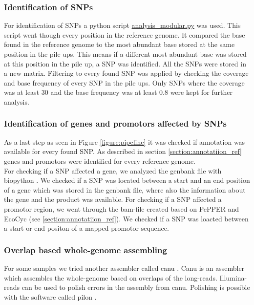 \subsubsection{Identification of SNPs} 
For identification of SNPs a python script \href{https://github.com/nahanoo/ESBL\_project/pileup.py}{analysis\_modular.py} was used. This script went though every position in the reference genome. It compared the base found in the reference genome to the most abundant base stored at the same position in the pile ups. This means if a different most abundant base was stored at this position in the pile up, a SNP was identified. All the SNPs were stored in a new matrix. Filtering to every found SNP was applied by checking the coverage and base frequency of every SNP in the pile ups. Only SNPs where the coverage was at least 30 and the base frequency was at least 0.8 were kept for further analysis. 

\subsubsection{Identification of genes and promotors affected by SNPs}
As a last step as seen in Figure \ref{figure:pipeline} it was checked if annotation was available for every found SNP. As described in section \ref{section:annotatiion_ref} genes and promotors were identified for every reference genome. \\
For checking if a SNP affected a gene, we analyzed the genbank file with biopython \cite{cock_biopython:_2009}. We checked if a SNP was located between a start and an end position of a gene which was stored in  the genbank file, where also the information about the gene and the product was available. For checking if a SNP affected a promotor region, we went through the bam-file created based on PePPER and EcoCyc (see \ref{section:annotatiion_ref}). We checked if a SNP was loacted between a start or end positon of a mapped promotor sequence. 

\subsubsection{Overlap based whole-genome assembling}
For some samples we tried another assembler called canu \cite{koren_canu:_2017}. Canu is an assembler which assembles the whole-genome based on overlaps of the long-reads. Illumina-reads can be used to polish errors in the assembly from canu. Polishing is possible with the software called pilon \cite{noauthor_pilon:_nodate}.


